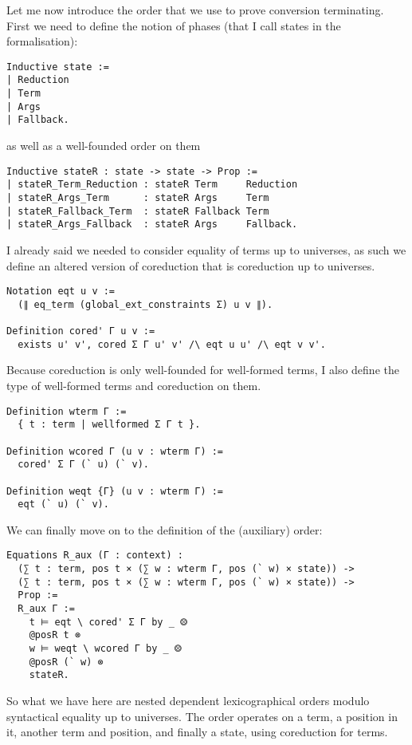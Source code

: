 Let me now introduce the order that we use to prove conversion terminating.
First we need to define the notion of phases (that I call states in the
formalisation):
\begin{verbatim}
Inductive state :=
| Reduction
| Term
| Args
| Fallback.
\end{verbatim}
as well as a well-founded order on them
\begin{verbatim}
Inductive stateR : state -> state -> Prop :=
| stateR_Term_Reduction : stateR Term     Reduction
| stateR_Args_Term      : stateR Args     Term
| stateR_Fallback_Term  : stateR Fallback Term
| stateR_Args_Fallback  : stateR Args     Fallback.
\end{verbatim}

I already said we needed to consider equality of terms up to universes, as such
we define an altered version of coreduction that is coreduction up to universes.
\begin{verbatim}
Notation eqt u v :=
  (∥ eq_term (global_ext_constraints Σ) u v ∥).

Definition cored' Γ u v :=
  exists u' v', cored Σ Γ u' v' /\ eqt u u' /\ eqt v v'.
\end{verbatim}

Because coreduction is only well-founded for well-formed terms, I also define
the type of well-formed terms and coreduction on them.
\begin{verbatim}
Definition wterm Γ :=
  { t : term | wellformed Σ Γ t }.

Definition wcored Γ (u v : wterm Γ) :=
  cored' Σ Γ (` u) (` v).

Definition weqt {Γ} (u v : wterm Γ) :=
  eqt (` u) (` v).
\end{verbatim}

We can finally move on to the definition of the (auxiliary) order:
\begin{verbatim}
Equations R_aux (Γ : context) :
  (∑ t : term, pos t × (∑ w : wterm Γ, pos (` w) × state)) ->
  (∑ t : term, pos t × (∑ w : wterm Γ, pos (` w) × state)) ->
  Prop :=
  R_aux Γ :=
    t ⊨ eqt \ cored' Σ Γ by _ ⨷
    @posR t ⊗
    w ⊨ weqt \ wcored Γ by _ ⨷
    @posR (` w) ⊗
    stateR.
\end{verbatim}
So what we have here are nested dependent lexicographical orders modulo
syntactical equality up to universes.
The order operates on a term, a position in it, another term and position, and
finally a state, using coreduction for terms.

